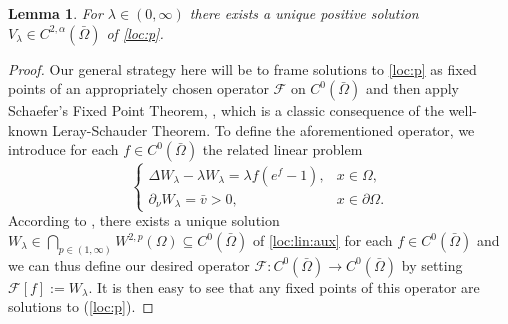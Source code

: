 \documentclass[12pt,a4paper]{amsart}
\newtheorem{lemma}[theorem]{Lemma}
\theoremstyle{definition}
\theoremstyle{remark}
\numberwithin{equation}{section}
\numberwithin{theorem}{section}
\begin{document}
\begin{lemma}\label{Exist:loc}
For $\lambda\in(0,\infty)$ there exists a unique positive solution $V_\lambda\in C^{2,\alpha}(\bar{\Omega})$ of \eqref{loc:p}.
\end{lemma} 
\begin{proof}
Our general strategy here will be to frame solutions to \eqref{loc:p} as fixed points of an appropriately chosen operator $\mathcal{F}$ on $C^0(\bar\Omega)$ and then apply Schaefer's Fixed Point Theorem, \cite[Theorem 9.2.2.4]{Evans}, which is a classic consequence of the well-known Leray-Schauder Theorem. To define the aforementioned operator, we introduce for each $f\in C^0(\bar{\Omega})$ the related linear problem 
\begin{equation}\label{loc:lin:aux}
\left\{\begin{array}{lr}
\Delta  W_{\lambda}-\lambda  W_{\lambda} = \lambda f( e^{f}-1),& x\in\Omega,\\
\partial_\nu  W_{\lambda}=\bar{v}>0,& x\in\partial\Omega.
\end{array}\right.
\end{equation}  
According to \cite[Theorem 2.4.2.7]{Grisvard}, there exists a unique solution $ W_{\lambda} \in \bigcap_{p\in(1,\infty)} W^{2,p}(\Omega) \subseteq C^0(\bar\Omega)$ of \eqref{loc:lin:aux} for each $f\in C^0(\bar\Omega)$ and we can thus define our desired operator $\mathcal{F} : C^0(\bar\Omega) \rightarrow C^0(\bar\Omega)$ by setting $\mathcal{F}[f] := W_{\lambda}$. It is then easy to see that any fixed points of this operator are solutions to (\ref{loc:p}).


\end{proof}
\end{document}
